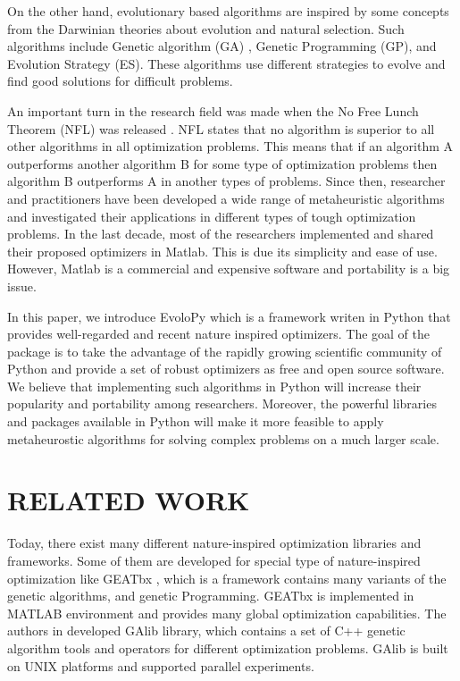 \documentclass[a4paper,twoside]{article}
\begin{document}
On the other hand, evolutionary based algorithms are inspired by some concepts from the Darwinian theories about evolution and natural selection. Such algorithms include Genetic algorithm (GA) \cite{Sivanandam}, Genetic Programming (GP)\cite{Koza1992}, and Evolution Strategy (ES)\cite{Beyer2002}. These algorithms use different strategies to evolve and find good solutions for difficult problems. 

An important turn in the research field was made when the No Free Lunch Theorem (NFL) was released \cite{wolpert1997no,ho2002simple}. NFL states that no algorithm is superior to all other algorithms in all optimization problems. This means that if an algorithm A outperforms another algorithm B for some type of optimization problems then algorithm B outperforms A in another types of problems. Since then, researcher and practitioners have been developed a wide range of metaheuristic algorithms and investigated their applications in different types of tough optimization problems. In the last decade, most of the researchers implemented and shared their proposed optimizers in Matlab. This is due its simplicity and ease of use. However, Matlab is a commercial and expensive software and portability is a big issue.

In this paper, we introduce EvoloPy which is a framework writen in Python that provides well-regarded and recent nature inspired optimizers. The goal of the package is to take the advantage of the rapidly growing scientific community of Python and provide a set of robust optimizers as free and open source software. We believe that implementing such algorithms in Python will increase their popularity and portability among researchers. Moreover, the powerful libraries and packages available in Python will make it more feasible to apply metaheurostic algorithms for solving complex problems on a much larger scale.



\section{\uppercase{Related Work}}
Today, there exist many different nature-inspired optimization libraries and frameworks. Some of them are developed for special type of nature-inspired optimization like GEATbx \cite{GEATbx}, which is a framework contains many variants of the genetic algorithms, and genetic Programming. GEATbx is implemented in MATLAB environment and provides many global optimization capabilities. The authors in \cite {GAlib} developed GAlib library, which contains a set of C++ genetic algorithm tools and operators for different optimization problems. GAlib is built on UNIX platforms and supported parallel experiments. 
\end{document}
